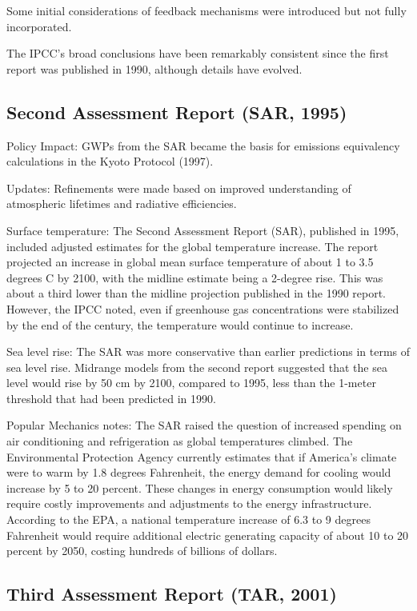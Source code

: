 \documentclass{tufte-handout}\usepackage[]{graphicx}\usepackage[]{xcolor}
\begin{document}
Some initial considerations of feedback mechanisms were introduced but not fully incorporated.

 The IPCC's broad conclusions have been remarkably consistent since the first report was published in 1990, although details have evolved.
 
 
 

\subsection{Second Assessment Report (SAR, 1995)}

Policy Impact: GWPs from the SAR became the basis for emissions equivalency calculations in the Kyoto Protocol (1997).


Updates: Refinements were made based on improved understanding of atmospheric lifetimes and radiative efficiencies.

Surface temperature: The Second Assessment Report (SAR), published in 1995, included adjusted estimates for the global temperature increase. The report projected an increase in global mean surface temperature of about 1 to 3.5 degrees C by 2100, with the midline estimate being a 2-degree rise. This was about a third lower than the midline projection published in the 1990 report. However, the IPCC noted, even if greenhouse gas concentrations were stabilized by the end of the century, the temperature would continue to increase.


Sea level rise: The SAR was more conservative than earlier predictions in terms of sea level rise. Midrange models from the second report suggested that the sea level would rise by 50 cm by 2100, compared to 1995, less than the 1-meter threshold that had been predicted in 1990.

Popular Mechanics notes: The SAR raised the question of increased spending on air conditioning and refrigeration as global temperatures climbed. The Environmental Protection Agency currently estimates that if America's climate were to warm by 1.8 degrees Fahrenheit, the energy demand for cooling would increase by 5 to 20 percent. These changes in energy consumption would likely require costly improvements and adjustments to the energy infrastructure. According to the EPA, a national temperature increase of 6.3 to 9 degrees Fahrenheit would require additional electric generating capacity of about 10 to 20 percent by 2050, costing hundreds of billions of dollars.

\subsection{Third Assessment Report (TAR, 2001)}
\end{document}
